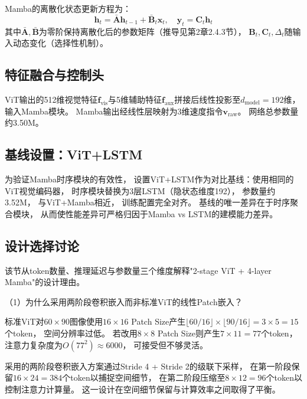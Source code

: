 Mamba的离散化状态更新方程为：
\begin{equation}
  \mathbf{h}_t = \bar{\mathbf{A}} \mathbf{h}_{t-1} + \bar{\mathbf{B}}_t \mathbf{x}_t, \quad
  \mathbf{y}_t = \mathbf{C}_t \mathbf{h}_t
  \label{eq:mamba_discrete_ch3}
\end{equation}
其中$\bar{\mathbf{A}}, \bar{\mathbf{B}}$为零阶保持离散化后的参数矩阵（推导见第2章2.4.3节），
$\mathbf{B}_t, \mathbf{C}_t, \Delta_t$随输入动态变化（选择性机制）。

\subsection{特征融合与控制头}

ViT输出的512维视觉特征$\mathbf{f}_{\text{vis}}$与5维辅助特征$\mathbf{f}_{\text{aux}}$拼接后线性投影至$d_{\text{model}}=192$维，
输入Mamba模块。
Mamba输出经线性层映射为3维速度指令$\mathbf{v}_{\text{raw}}$。
网络总参数量约3.50M。

\subsection{基线设置：ViT+LSTM}

为验证Mamba时序模块的有效性，
设置ViT+LSTM作为对比基线：使用相同的ViT视觉编码器，
时序模块替换为3层LSTM（隐状态维度192），
参数量约3.52M，
与ViT+Mamba相近，
训练配置完全对齐。
基线的唯一差异在于时序聚合模块，
从而使性能差异可严格归因于Mamba vs LSTM的建模能力差异。

\subsection{设计选择讨论}

该节从token数量、推理延迟与参数量三个维度解释"2-stage ViT + 4-layer Mamba"的设计理由。

（1）为什么采用两阶段卷积嵌入而非标准ViT的线性Patch嵌入？

标准ViT\cite{Dosovitskiy2020ViT}对$60 \times 90$图像使用$16 \times 16$ Patch Size产生$\lfloor 60/16\rfloor \times \lfloor 90/16\rfloor = 3 \times 5 = 15$个token，
空间分辨率过低。
若改用$8 \times 8$ Patch Size则产生$7 \times 11 = 77$个token，
注意力复杂度为$O(77^2) \approx 6000$，
可接受但不够灵活。

采用的两阶段卷积嵌入方案通过Stride 4 + Stride 2的级联下采样，
在第一阶段保留$16 \times 24 = 384$个token以捕捉空间细节，
在第二阶段压缩至$8 \times 12 = 96$个token以控制注意力计算量。
这一设计在空间细节保留与计算效率之间取得了平衡。


